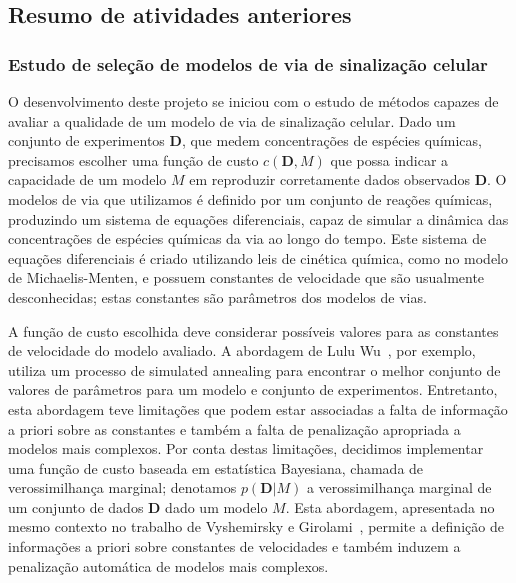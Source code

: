 \documentclass[12pt]{article}
\begin{document}
\subsection{Resumo de atividades anteriores}
\subsubsection{Estudo de seleção de modelos de via de sinalização celular}
O desenvolvimento deste projeto se iniciou com o estudo de métodos
capazes de avaliar a qualidade de um modelo de via de sinalização 
celular. Dado um conjunto de experimentos $\mathbf{D}$, que medem
concentrações de espécies químicas, precisamos escolher uma função de
custo $c (\mathbf{D}, M)$ que possa indicar a capacidade de um modelo
$M$ em reproduzir corretamente dados observados $\mathbf{D}$. O modelos
de via que utilizamos é definido por um conjunto de reações químicas,
produzindo um sistema de equações diferenciais, capaz de simular a
dinâmica das concentrações de espécies químicas da via ao longo do
tempo. Este sistema de equações diferenciais é criado utilizando leis de
cinética química, como no modelo de Michaelis-Menten, e possuem
constantes de velocidade que são usualmente desconhecidas; estas
constantes são parâmetros dos modelos de vias.

A função de custo escolhida deve considerar possíveis valores para as
constantes de velocidade do modelo avaliado. A abordagem de Lulu
Wu~\cite{Wu2015metodo}, por exemplo, utiliza um processo de simulated
annealing para encontrar o melhor conjunto de valores de parâmetros para
um modelo e conjunto de experimentos. Entretanto, esta abordagem teve
limitações que podem estar associadas a falta de informação a priori
sobre as constantes e também a falta de penalização apropriada a modelos
mais complexos. Por conta destas limitações, decidimos implementar uma
função de custo baseada em estatística Bayesiana, chamada de
verossimilhança marginal; denotamos $p (\mathbf{D} | M)$ a 
verossimilhança marginal de um conjunto de dados $\mathbf{D}$ dado um 
modelo $M$. Esta abordagem, apresentada no mesmo contexto no trabalho de 
Vyshemirsky e Girolami~\cite{Vyshemirsky2008}, permite a definição de 
informações a priori sobre constantes de velocidades e também induzem a 
penalização automática de modelos mais complexos.

\end{document}

